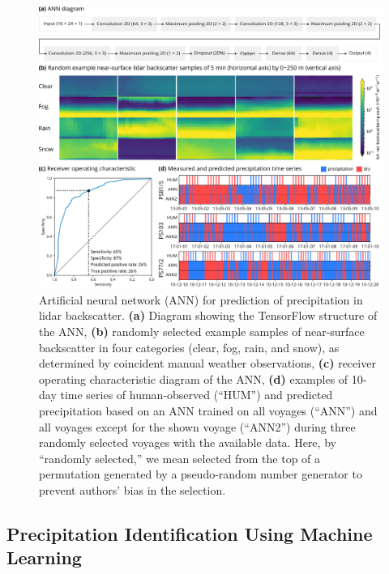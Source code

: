 \documentclass[draft]{agujournal2019}
\begin{document}
\begin{figure}[b!]
\centering
\includegraphics[width=\textwidth]{img/ann.pdf}
\caption{
Artificial neural network (ANN) for prediction of precipitation in lidar backscatter. \textbf{(a)} Diagram showing the TensorFlow structure of the ANN, \textbf{(b)} randomly selected example samples of near-surface backscatter in four categories (clear, fog, rain, and snow), as determined by coincident manual weather observations, \textbf{(c)} receiver operating characteristic diagram of the ANN, \textbf{(d)} examples of 10-day time series of human-observed (``HUM'') and predicted precipitation based on an ANN trained on all voyages (``ANN'') and all voyages except for the shown voyage (``ANN2'') during three randomly selected voyages with the available data. Here, by ``randomly selected,'' we mean selected from the top of a permutation generated by a pseudo-random number generator to prevent authors' bias in the selection.
}
\label{fig:ann}
\end{figure}

\subsection{Precipitation Identification Using Machine Learning}
\label{sec:ann}
\end{document}
